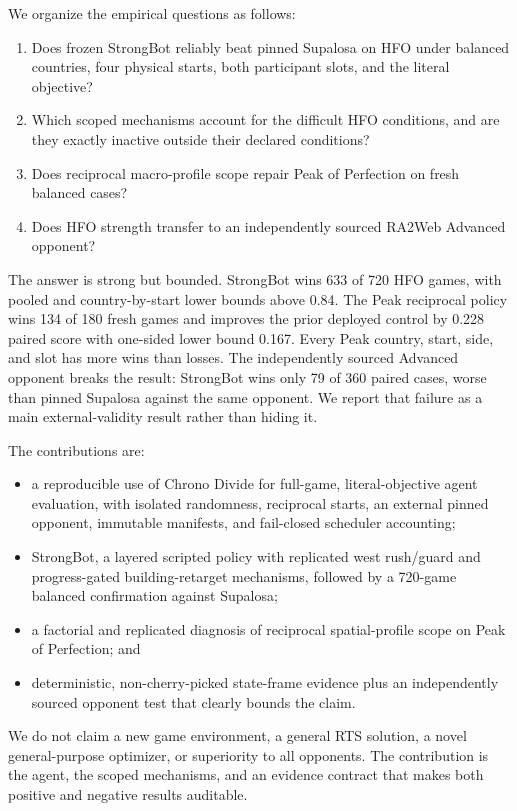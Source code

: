 We organize the empirical questions as follows:

\begin{enumerate}
  \item[RQ1.] Does frozen StrongBot reliably beat pinned Supalosa on HFO under
  balanced countries, four physical starts, both participant slots, and the
  literal objective?
  \item[RQ2.] Which scoped mechanisms account for the difficult HFO conditions,
  and are they exactly inactive outside their declared conditions?
  \item[RQ3.] Does reciprocal macro-profile scope repair Peak of Perfection on
  fresh balanced cases?
  \item[RQ4.] Does HFO strength transfer to an independently sourced RA2Web
  Advanced opponent?
\end{enumerate}

The answer is strong but bounded. StrongBot wins 633 of 720 HFO games, with
pooled and country-by-start lower bounds above 0.84. The Peak reciprocal policy
wins 134 of 180 fresh games and improves the prior deployed control by 0.228
paired score with one-sided lower bound 0.167. Every Peak country, start, side,
and slot has more wins than losses. The independently sourced Advanced
opponent breaks the result: StrongBot wins only 79 of 360 paired cases, worse
than pinned Supalosa against the same opponent. We report that failure as a
main external-validity result rather than hiding it.

The contributions are:

\begin{itemize}
  \item a reproducible use of Chrono Divide for full-game, literal-objective
  agent evaluation, with isolated randomness, reciprocal starts, an external
  pinned opponent, immutable manifests, and fail-closed scheduler accounting;
  \item StrongBot, a layered scripted policy with replicated west rush/guard
  and progress-gated building-retarget mechanisms, followed by a 720-game
  balanced confirmation against Supalosa;
  \item a factorial and replicated diagnosis of reciprocal spatial-profile
  scope on Peak of Perfection; and
  \item deterministic, non-cherry-picked state-frame evidence plus an
  independently sourced opponent test that clearly bounds the claim.
\end{itemize}

We do not claim a new game environment, a general RTS solution, a novel
general-purpose optimizer, or superiority to all opponents. The contribution is
the agent, the scoped mechanisms, and an evidence contract that makes both
positive and negative results auditable.
